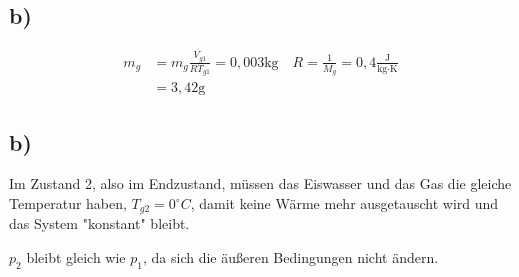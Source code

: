 

\subsection*{b)}
\begin{align*}
    m_g &= m_g \frac{V_{g1}}{R T_{g1}} = 0,003 \text{kg} \quad R = \frac{1}{M_g} = 0,4 \frac{\text{J}}{\text{kg} \cdot \text{K}} \\
    &= 3,42 \text{g}
\end{align*}



\subsection*{b)}
Im Zustand 2, also im Endzustand, müssen das Eiswasser und das Gas die gleiche Temperatur haben, $T_{g2} = 0^\circ C$, damit keine Wärme mehr ausgetauscht wird und das System "konstant" bleibt.

$p_2$ bleibt gleich wie $p_1$, da sich die äußeren Bedingungen nicht ändern.